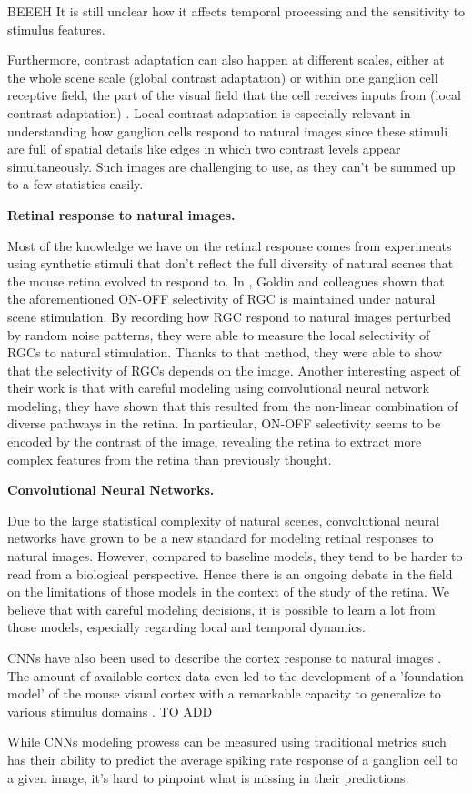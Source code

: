 
BEEEH It is still unclear how it
affects temporal processing and the sensitivity to stimulus
features\citep{baccus_fast_2002}.

Furthermore, contrast adaptation can also
happen at different scales, either at the whole scene scale (global contrast
adaptation) or within one ganglion cell receptive field, the part of the visual
field that the cell receives inputs from (local contrast adaptation)
\citep{garvert_local_2013}. Local contrast adaptation is especially relevant in
understanding how ganglion cells respond to natural images since these stimuli
are full of spatial details like edges in which two contrast levels appear
simultaneously. Such images are challenging to use, as they can't be summed up
to a few statistics easily.

\textbf{Retinal response to natural images.}

Most of the knowledge we have on the retinal response comes from experiments
using synthetic stimuli that don't reflect the full diversity of natural
scenes that the mouse retina evolved to respond to. In
\cite{goldin_context-dependent_2022}, Goldin and colleagues shown that the
aforementioned ON-OFF selectivity of RGC is maintained under natural scene
stimulation. By recording how RGC respond to natural images perturbed by
random noise patterns, they were able to measure the local selectivity of RGCs
to natural stimulation.
Thanks to that method, they were able to show that the selectivity of RGCs
depends on the image. Another interesting aspect of their work is that with
careful modeling using convolutional neural network modeling, they have shown
that this resulted from the non-linear combination of diverse pathways in the
retina. In particular, ON-OFF selectivity seems to be encoded by the contrast
of the image, revealing the retina to extract more complex features from the
retina than previously thought.

\textbf{Convolutional Neural Networks.}

Due to the large statistical complexity of natural scenes, convolutional neural
networks have grown to be a new standard for modeling retinal responses to
natural images. However, compared to baseline models, they tend to be harder to
read from a biological perspective. Hence there is an ongoing debate in the
field on the limitations of those models in the context of the study of the
retina. We believe that with careful modeling decisions, it is possible to
learn a lot from those models, especially regarding local and temporal
dynamics.

CNNs have also been used to describe the cortex response to natural images
\cite{cadena_deep_2019}. The amount of available cortex data even led to the
development of a 'foundation model' of the mouse visual cortex with a
remarkable capacity to generalize to various stimulus domains \cite{wang}. TO
ADD

While CNNs modeling prowess can be measured using traditional metrics such has
their ability to predict the average spiking rate response of a ganglion cell
to a given image, it's hard to pinpoint what is missing in their predictions.